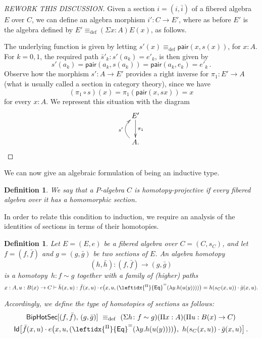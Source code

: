 \documentclass[10pt,a4paper,oneside,reqno]{amsart}
\numberwithin{equation}{section}
\theoremstyle{mythm}
\theoremstyle{mydef}
\newtheorem{definition}[theorem]{Definition}
\theoremstyle{myrmk}
\newcommand{\ie}{\text{i.e.\ }}
\newcommand{\deq}{\equiv}
\newcommand{\defeq}{\deq_{\mathrm{def}}}
\newcommand{\co}{\colon}
\newcommand{\ct}{\cdot}
\newcommand{\funext}{\leftidx{^\Pi}{\mathsf{Eq}}^{=}}
\newcommand{\pair}{\mathsf{pair}}
\newcommand{\Id}{\mathsf{Id}}
\newcommand{\HoSec}{\mathsf{BipHotSec}}
\begin{document}
\begin{proof}
[REWORK THIS DISCUSSION]
Given a section $i = (i, \bar{i})$ of a fibered algebra $E$ over $C$, we can define an algebra morphism $i' \co C \to E'$, where as before $E'$ is the algebra defined by $E' \defeq (\Sigma x :A) E(x)$, as follows.

The underlying function is given by letting $s'(x) \defeq \pair(x, s(x))$, for $x : A$. For $k = 0, 1$, the required path $\bar{s}'_k \co s'(a_k) = e'_k$,
is then given by
\[
s'(a_k) = \pair(a_k, s(a_k)) =  \pair(a_k, e_k) = e'_k \, .
\]
Observe how the morphism $s' \co A \to E'$ provides a right inverse for $\pi_1 \co E' \to A$ (\ie what is usually called a section in 
category theory), since we have
\[
(\pi_1 \circ s)(x) = \pi_1 (\pair(x, sx)) = x 
\]
for every $x \co A$. We represent this situation with the diagram
\[
\xymatrix{
E' \ar[d]^{\pi_1} \\
A . \ar@/^1.2pc/[u]^{s'} }
\]
\end{proof}

We can now give an algebraic formulation of being an inductive type.

\begin{definition} We say that a $P$-algebra $C$ is \emph{homotopy-projective} if every fibered algebra over it has a homomorphic section.
\end{definition} 

In order to relate this condition to induction, we require an analysis of the identities of sections in terms of their homotopies.

\begin{definition} \label{def:W2cellsection} Let $E = (E, e)$ be a fibered algebra over $C = (C, s_C)$, and let $f = (f, \bar{f})$ and $g = (g, \bar{g})$ be two sections of $E$.  An \emph{algebra homotopy} 
\[
(h, \bar{h}) \co (f, \bar{f})  \rightarrow (g, \bar{g})
\] 
is a homotopy~$h\co f \sim g$ together with a family of (higher) paths 
\[
x : A, u : B(x) \to C \vdash \bar{h}(x,u) : 
\bar{f}(x,u)  \ct e\big(x,u,(\funext(\lambda{y}.h(u(y))))\big) = 
h(s_C(x,u)) \ct \bar{g}(x,u).
\]

Accordingly, we define the type of homotopies of sections as follows:
\begin{multline*}
\HoSec[ (f, \bar{f}) ,\, (g, \bar{g}) ]\ \defeq\ 
(\Sigma h \co f \sim g) (\Pi x : A)(\Pi u : B(x) \to C)\\
\Id\big[ \bar{f}(x,u)  \ct e\big(x,u,(\funext(\lambda{y}.h(u(y))))\big),\ 
h(s_C(x,u)) \ct \bar{g}(x,u) \big]\, .
\end{multline*}
\end{definition} 
\end{document}
